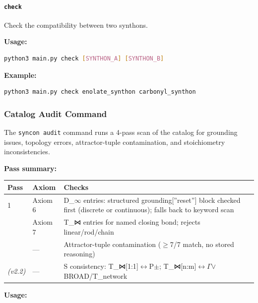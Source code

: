 \documentclass[12pt,a4paper]{article}
\begin{document}
\paragraph{\texttt{check}}

Check the compatibility between two synthons.

\textbf{Usage:}

\begin{lstlisting}[language=bash]
python3 main.py check [SYNTHON_A] [SYNTHON_B]
\end{lstlisting}

\textbf{Example:}

\begin{lstlisting}[language=bash]
python3 main.py check enolate_synthon carbonyl_synthon
\end{lstlisting}

\subsubsection{Catalog Audit Command}

The \texttt{syncon audit} command runs a 4-pass scan of the catalog for grounding issues, topology errors, attractor-tuple contamination, and stoichiometry inconsistencies.

\textbf{Pass summary:}

\begin{table}[htbp]
\centering
\small
{}
\begin{tabularx}{\textwidth}{>{\centering\arraybackslash}X >{\centering\arraybackslash}X >{\centering\arraybackslash}X}
\toprule
\rowcolor{gray!25}\textbf{Pass} & \textbf{Axiom} & \textbf{Checks} \\
\midrule
\rowcolors{1}{white}{gray!10}
1 & Axiom 6 & D\_$\infty$ entries: structured grounding{[}''reset''{]} block checked first (discrete or continuous); falls back to keyword scan \\
2 & Axiom 7 & T\_⋈ entries for named closing bond; rejects linear/rod/chain \\
3 & --- & Attractor-tuple contamination ($\geq$7/7 match, no stored reasoning) \\
4 \emph{(v2.2)} & --- & S consistency: T\_⋈{[}1:1{]}$\leftrightarrow$P$\pm$; T\_⋈{[}n:m{]}$\leftrightarrow$$\Gamma$$\lor$BROAD/T\_network \\
\bottomrule
\end{tabularx}
\end{table}

\textbf{Usage:}
\end{document}
